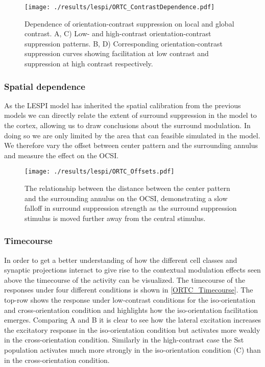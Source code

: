 \begin{figure}
	\centering
        \texttt{[image: ./results/lespi/ORTC\_ContrastDependence.pdf]}
	\caption[Dependence of orientation-contrast suppression on local
      and global contrast.]{Dependence of orientation-contrast
      suppression on local and global contrast. A, C) Low- and
      high-contrast orientation-contrast suppression patterns. B, D)
      Corresponding orientation-contrast suppression curves showing
      facilitation at low contrast and suppression at high contrast
      respectively.}
	\label{ORTC_ContrastDependence}
\end{figure}

\subsubsection{Spatial dependence}

As the LESPI model has inherited the spatial calibration from the
previous models we can directly relate the extent of surround
suppression in the model to the cortex, allowing us to draw
conclusions about the surround modulation. In doing so we are only
limited by the area that can feasible simulated in the model. We
therefore vary the offset between center pattern and the surrounding
annulus and measure the effect on the OCSI.

\begin{figure}
	\centering
        \texttt{[image: ./results/lespi/ORTC\_Offsets.pdf]}
	\caption[Spatial dependence of surround suppression.]{The
      relationship between the distance between the center pattern and
      the surrounding annulus on the OCSI, demonstrating a slow
      falloff in surround suppression strength as the surround
      suppression stimulus is moved further away from the central stimulus.}
	\label{ORTC_OffsetCurve}
\end{figure}

\subsubsection{Timecourse}

In order to get a better understanding of how the different cell
classes and synaptic projections interact to give rise to the
contextual modulation effects seen above the timecourse of the
activity can be visualized. The timecourse of the responses under four
different conditions is shown in \ref{ORTC_Timecourse}. The top-row
shows the response under low-contrast conditions for the
iso-orientation and cross-orientation condition and highlights how the
iso-orientation facilitation emerges. Comparing A and B it is clear to
see how the lateral excitation increases the excitatory response in
the iso-orientation condition but activates more weakly in the
cross-orientation condition. Similarly in the high-contrast case the
Sst population activates much more strongly in the iso-orientation
condition (C) than in the cross-orientation condition.

